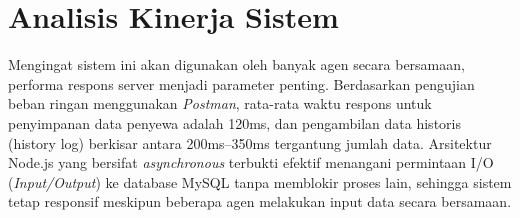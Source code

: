 \section{Analisis Kinerja Sistem} %
Mengingat sistem ini akan digunakan oleh banyak agen secara bersamaan, performa respons server menjadi parameter penting. Berdasarkan pengujian beban ringan menggunakan \textit{Postman}, rata-rata waktu respons untuk penyimpanan data penyewa adalah 120ms, dan pengambilan data historis (history log) berkisar antara 200ms--350ms tergantung jumlah data. Arsitektur Node.js yang bersifat \textit{asynchronous} terbukti efektif menangani permintaan I/O (\textit{Input/Output}) ke database MySQL tanpa memblokir proses lain, sehingga sistem tetap responsif meskipun beberapa agen melakukan input data secara bersamaan.